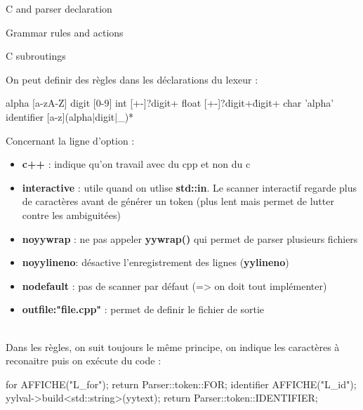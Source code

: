 \documentclass[a4paper]{article}%
\begin{document}
\begin{code}
C and parser declaration

Grammar rules and actions

C subroutings
\end{code}\leavevmode\newline


\noindent
On peut definir des règles dans les déclarations du lexeur :

\begin{code}

alpha [a-zA-Z]
digit [0-9]
int [+-]?{digit}+
float [+-]?{digit}+\.{digit}+
char '{alpha}'
identifier [a-z]({alpha}|{digit}|_)*
\end{code}\leavevmode\newline

\noindent
Concernant la ligne d'option :
\begin{itemize}
\item \textbf{c++} : indique qu'on travail avec du cpp et non du c
\item \textbf{interactive} : utile quand on utlise \textbf{std::in}. Le scanner interactif regarde plus de caractères avant de générer un token (plus lent mais permet de lutter contre les ambiguitées)
\item \textbf{noyywrap} : ne pas appeler \textbf{yywrap()} qui permet de parser plusieurs fichiers
\item \textbf{noyylineno}: désactive l'enregistrement des lignes (\textbf{yylineno})
\item \textbf{nodefault} : pas de scanner par défaut (=> on doit tout implémenter)
\item \textbf{outfile:"file.cpp"} : permet de definir le fichier de sortie
\end{itemize}\leavevmode\\[3\baselineskip]


\noindent
Dans les règles, on suit toujours le même principe, on indique les caractères à reconaitre puis on exécute du code :\\

\begin{code}
for          { AFFICHE("L_for"); return Parser::token::FOR; }
{identifier} {
  AFFICHE("L_id");
  yylval->build<std::string>(yytext);
  return Parser::token::IDENTIFIER;
}
\end{code}\leavevmode\newline
\end{document}
